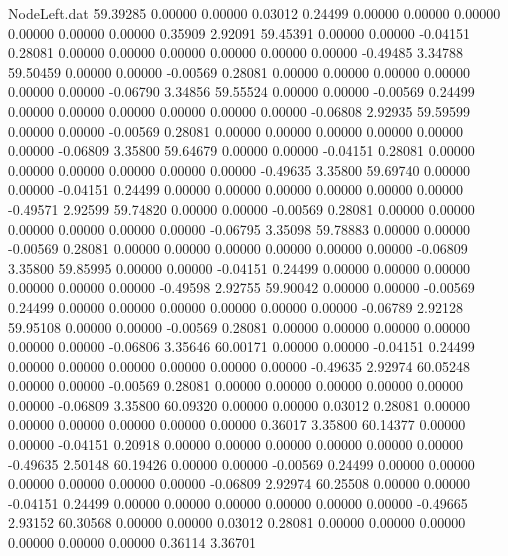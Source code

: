 \begin{filecontents}{NodeLeft.dat}
  59.39285    0.00000    0.00000     0.03012    0.24499    0.00000    0.00000    0.00000    0.00000    0.00000    0.00000    0.35909    2.92091
  59.45391    0.00000    0.00000    -0.04151    0.28081    0.00000    0.00000    0.00000    0.00000    0.00000    0.00000   -0.49485    3.34788
  59.50459    0.00000    0.00000    -0.00569    0.28081    0.00000    0.00000    0.00000    0.00000    0.00000    0.00000   -0.06790    3.34856
  59.55524    0.00000    0.00000    -0.00569    0.24499    0.00000    0.00000    0.00000    0.00000    0.00000    0.00000   -0.06808    2.92935
  59.59599    0.00000    0.00000    -0.00569    0.28081    0.00000    0.00000    0.00000    0.00000    0.00000    0.00000   -0.06809    3.35800
  59.64679    0.00000    0.00000    -0.04151    0.28081    0.00000    0.00000    0.00000    0.00000    0.00000    0.00000   -0.49635    3.35800
  59.69740    0.00000    0.00000    -0.04151    0.24499    0.00000    0.00000    0.00000    0.00000    0.00000    0.00000   -0.49571    2.92599
  59.74820    0.00000    0.00000    -0.00569    0.28081    0.00000    0.00000    0.00000    0.00000    0.00000    0.00000   -0.06795    3.35098
  59.78883    0.00000    0.00000    -0.00569    0.28081    0.00000    0.00000    0.00000    0.00000    0.00000    0.00000   -0.06809    3.35800
  59.85995    0.00000    0.00000    -0.04151    0.24499    0.00000    0.00000    0.00000    0.00000    0.00000    0.00000   -0.49598    2.92755
  59.90042    0.00000    0.00000    -0.00569    0.24499    0.00000    0.00000    0.00000    0.00000    0.00000    0.00000   -0.06789    2.92128
  59.95108    0.00000    0.00000    -0.00569    0.28081    0.00000    0.00000    0.00000    0.00000    0.00000    0.00000   -0.06806    3.35646
  60.00171    0.00000    0.00000    -0.04151    0.24499    0.00000    0.00000    0.00000    0.00000    0.00000    0.00000   -0.49635    2.92974
  60.05248    0.00000    0.00000    -0.00569    0.28081    0.00000    0.00000    0.00000    0.00000    0.00000    0.00000   -0.06809    3.35800
  60.09320    0.00000    0.00000     0.03012    0.28081    0.00000    0.00000    0.00000    0.00000    0.00000    0.00000    0.36017    3.35800
  60.14377    0.00000    0.00000    -0.04151    0.20918    0.00000    0.00000    0.00000    0.00000    0.00000    0.00000   -0.49635    2.50148
  60.19426    0.00000    0.00000    -0.00569    0.24499    0.00000    0.00000    0.00000    0.00000    0.00000    0.00000   -0.06809    2.92974
  60.25508    0.00000    0.00000    -0.04151    0.24499    0.00000    0.00000    0.00000    0.00000    0.00000    0.00000   -0.49665    2.93152
  60.30568    0.00000    0.00000     0.03012    0.28081    0.00000    0.00000    0.00000    0.00000    0.00000    0.00000    0.36114    3.36701

\end{filecontents}
